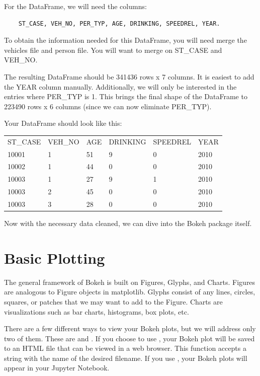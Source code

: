 \begin{problem}
For the  DataFrame, we will need the columns:
\begin{lstlisting}
    ST_CASE, VEH_NO, PER_TYP, AGE, DRINKING, SPEEDREL, YEAR.
\end{lstlisting}
To obtain the information needed
for this DataFrame, you will need merge the vehicles
file and person file. You will want to merge on ST\_CASE and VEH\_NO.

The resulting DataFrame should be 341436 rows x 7 columns. It is easiest to add
the YEAR column manually. Additionally, we will
only be interested in the entries where PER\_TYP is 1. This brings the final
shape of the DataFrame to 223490 rows x 6 columns (since we can now eliminate
PER\_TYP).

Your DataFrame should look like this:

\begin{tabular}{llllll}
ST\_CASE & VEH\_NO & AGE & DRINKING & SPEEDREL & YEAR \\
10001    & 1       & 51  & 9        & 0        & 2010 \\
10002    & 1       & 44  & 0        & 0        & 2010 \\
10003    & 1       & 27  & 9        & 1        & 2010 \\
10003    & 2       & 45  & 0        & 0        & 2010 \\
10003    & 3       & 28  & 0        & 0        & 2010
\end{tabular}
\end{problem}

Now with the necessary data cleaned, we can dive into the Bokeh package itself.

\section*{Basic Plotting}

The general framework of Bokeh is built on Figures, Glyphs, and Charts.
Figures are analogous to Figure objects in matplotlib. Glyphs consist of any
lines, circles, squares, or patches that we may want to add to the Figure.
Charts are visualizations such as bar charts, histograms, box plots, etc.

There are a few different ways to view your Bokeh plots, but we will address only
two of them. These are  and .
If you choose to use , your Bokeh plot will be saved to an HTML
file that can be viewed in a web browser. This function accepts a string with
the name of the desired filename. If you use , your Bokeh plots
will appear in your Jupyter Notebook.

